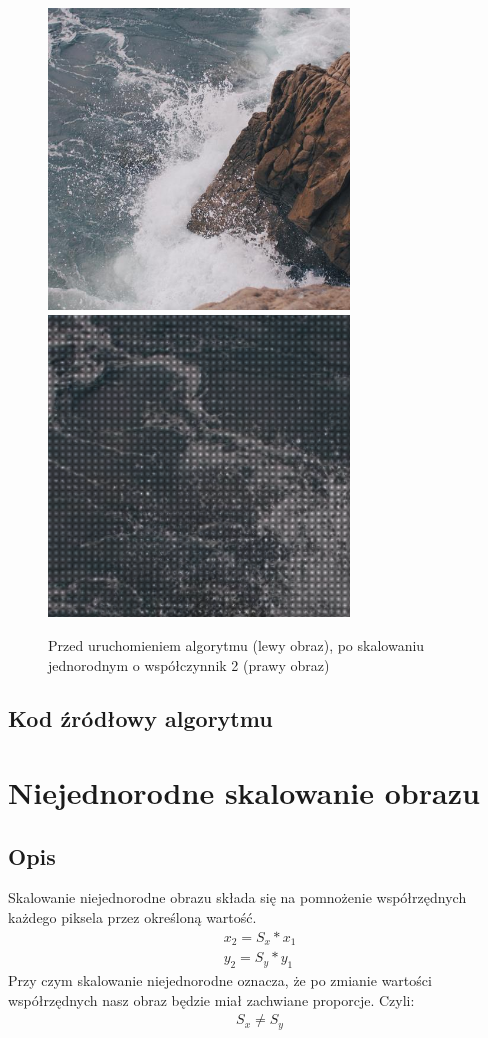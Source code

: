 \documentclass[a4paper,12pt]{book}
\begin{document}
\begin{figure}[H]
	\caption{Przed uruchomieniem algorytmu (lewy obraz), po skalowaniu jednorodnym o współczynnik 2 (prawy obraz)}
	\includegraphics[width=8cm, height=8cm]{sea-unmodified.jpg}
	\includegraphics[width=8cm, height=8cm]{4-2/homogeneous-scaling-sea.png}
\end{figure}

\subsection*{Kod źródłowy algorytmu}

\section{Niejednorodne skalowanie obrazu}
\subsection*{Opis}
Skalowanie niejednorodne obrazu składa się na pomnożenie współrzędnych każdego piksela przez określoną wartość. 
\begin{gather}
	x_2 = S_x * x_1 \\
	y_2 = S_y * y_1
\end{gather}
Przy czym skalowanie niejednorodne oznacza, że po zmianie wartości współrzędnych nasz obraz będzie miał zachwiane proporcje. Czyli: 
\begin{gather}
	S_x \neq S_y
\end{gather}
\end{document}

